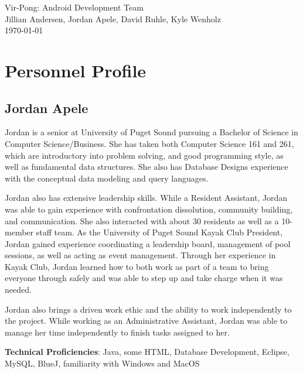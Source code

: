 \documentclass[12pt]{article}
\begin{document}
 \begin{titlepage}
    \vspace*{\fill}
    \begin{center}
      {\Huge Vir-Pong: Android Development Team}\\[0.5cm]
      {\Large Jillian Andersen, Jordan Apele, David Ruhle, Kyle Wenholz}\\[0.4cm]
      \today
    \end{center}
    \vspace*{\fill}
  \end{titlepage}

\tableofcontents
\newpage
\section{Personnel Profile}

\subsection{Jordan Apele}
Jordan is a senior at University of Puget Sound pursuing a Bachelor of
Science in Computer Science/Business. She has taken both Computer Science 161
and 261, which are introductory into problem solving, and good programming style,
as well as fundamental data structures. She also has Database Designs experience
with the conceptual data modeling and query languages.

Jordan also has extensive leadership skills. While a Resident Assistant,
Jordan was able to gain experience with confrontation dissolution, community
building, and communication. She also interacted with about 30 residents as well
as a 10-member staff team. As the University of Puget Sound Kayak Club President,
Jordan gained experience coordinating a leadership board, management of pool
sessions, as well as acting as event management. Through her experience in Kayak Club,
Jordan learned how to both work as part of a team to bring everyone through safely
and was able to step up and take charge when it was needed.

Jordan also brings a driven work ethic and the ability to work independently
to the project. While working as an Administrative Assistant, Jordan was able to
manage her time independently to finish tasks assigned to her.

\vspace*{5mm}

\noindent \textbf{Technical Proficiencies}: Java, some HTML, Database Development, Eclipse, MySQL, BlueJ, familiarity with Windows and MacOS
\end{document}
